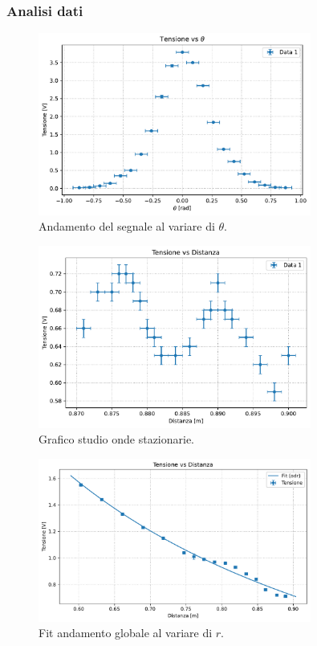 \documentclass[a4paper]{article}
\begin{document}
\subsubsection{Analisi dati}
\begin{figure}[htbp]
	\centering
	\includegraphics[width=0.8\textwidth]{grafici/theta_qualitativo.pdf}
	\caption{Andamento del segnale al variare di $\theta$.}
	\label{fig:theta_qualitativo}
\end{figure}
\begin{figure}[htbp]
	\centering
	\includegraphics[width=0.8\textwidth]{grafici/distanza_onde_stazionarie.pdf}
	\caption{Grafico studio onde stazionarie.}
	\label{fig:onde_stazionarie}
\end{figure}
\begin{figure}[htbp]
	\centering
	\includegraphics[width=0.8\textwidth]{grafici/distanza_massimi.pdf}
	\caption{Fit andamento globale al variare di $r$.}
	\label{fig:distanza_massimi}
\end{figure}
\end{document}
